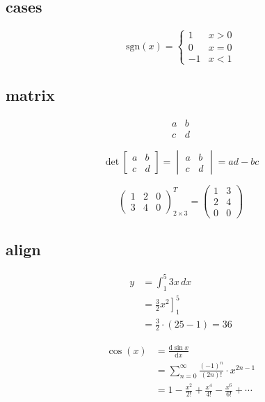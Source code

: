 \documentclass{article}
\begin{document}
\subsection{cases}

\[
\mathrm{sgn}(x) = \begin{cases}
    1 & x > 0 \\
    0 & x = 0 \\
    -1 & x < 1
\end{cases}
\]

\subsection{matrix}

\[
\begin{matrix}
    a & b \\
    c & d
\end{matrix}
\]

\[
\det\begin{bmatrix}
    a & b \\
    c & d
\end{bmatrix} = 
\begin{vmatrix}
    a & b \\
    c & d
\end{vmatrix}
= ad - bc
\]

\[
\begin{pmatrix}
    1 & 2 & 0\\
    3 & 4 & 0
\end{pmatrix}_{2\times 3}^T
=
\begin{pmatrix}
    1 & 3\\
    2 & 4\\
    0 & 0
\end{pmatrix}
\]

\subsection{align}

\begin{align}
    y &= \int_1^5 3x\, dx \\
     &= \left. \frac{3}{2}x^2 \right]_1^5 \\
     &= \frac{3}{2} \cdot (25 - 1) = 36
\end{align}

\begin{align}
    \cos(x) &= \frac{\mathrm{d}\sin x}{\mathrm{d}x} \\
     &= \sum_{n=0}^\infty \frac{(-1)^n}{(2n)!}\cdot x^{2n - 1} \\
     &= 1 - \frac{x^2}{2!} + \frac{x^4}{4!} - \frac{x^6}{6!} + \cdots
\end{align}
\end{document}

